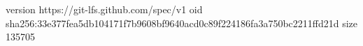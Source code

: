 version https://git-lfs.github.com/spec/v1
oid sha256:33e377fea5db104171f7b9608bf9640acd0c89f224186fa3a750bc2211ffd21d
size 135705
